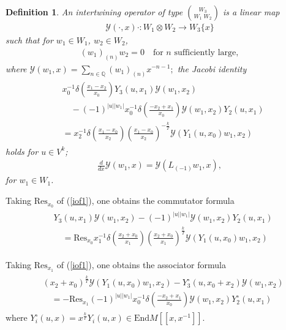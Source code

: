\documentclass[9pt]{amsart}
\newtheorem{definition}{Definition}[section]
\begin{document}
\begin{definition}
An intertwining operator of type $\binom{W_{3}}{W_{1}\;W_{2}}$ is a linear map
\begin{align*}
    \mathcal{Y}(\cdot,x)\cdot :W_{1}\otimes W_2 \rightarrow W_3\{x\}
\end{align*}
such that for $w_{1}\in W_{1}$, $w_{2}\in W_{2}$,
\begin{align}
    (w_{1})_{(n)}w_{2}=0\quad \text{for $n$ sufficiently large},
\end{align}
where $\mathcal{Y}(w_1,x)=\sum_{n\in \mathbb{Q}}(w_1)_{(n)}x^{-n-1};$
the Jacobi identity
\begin{align}\label{iof1}
\begin{split}
  &  x_0^{-1}\delta\left(\frac{x_1-x_2}{x_0}\right)Y_{3}(u,x_{1})\mathcal{Y}(w_1,x_2) \\
  &  \quad -(-1)^{|u||w_1|}x_0^{-1}\delta\left(\frac{-x_2+x_1}{x_0}\right)\mathcal{Y}(w_1,x_2)Y_{2}(u,x_1) \\
  &= x_2^{-1}\delta\left(\frac{x_1-x_0}{x_2}\right)\left(\frac{x_1-x_0}{x_2}\right)^{-\frac{k}{T}}\mathcal{Y}(Y_{1}(u,x_0)w_1,x_2)
\end{split}
\end{align}
holds for $u\in V^{k}$;
\begin{align}
    \frac{d}{dx}\mathcal{Y}(w_{1},x)=\mathcal{Y}(L_{(-1)}w_1,x),
\end{align}
for $w_1\in W_1$.
\end{definition}

Taking $\text{Res}_{x_{0}}$ of (\ref{iof1}), one obtains the commutator formula
\begin{align}\label{commutator1}
    \begin{split}
        &Y_{3}(u,x_{1})\mathcal{Y}(w_1,x_2) - (-1)^{|u||w_1|}\mathcal{Y}(w_1,x_2)Y_{2}(u,x_1) \\
        &\quad = \text{Res}_{x_{0}} x_1^{-1}\delta\left(\frac{x_2+x_0}{x_1}\right)\left(\frac{x_2+x_0}{x_1}\right)^{\frac{k}{T}} \mathcal{Y}(Y_{1}(u,x_0)w_1,x_2)
    \end{split}
\end{align}

Taking $\text{Res}_{x_{1}}$ of (\ref{iof1}), one obtains the associator formula
\begin{align}\label{associator}
    \begin{split}
        &(x_2+x_0)^{\frac{k}{T}}\mathcal{Y}(Y_1(u,x_0)w_1,x_2) - Y_3^\circ(u,x_0+x_2)\mathcal{Y}(w_1,x_2) \\
        &\quad = -\text{Res}_{x_{1}}(-1)^{|u||w_1|}x_0^{-1}\delta\left(\frac{-x_2+x_1}{x_0}\right)\mathcal{Y}(w_1,x_2)Y_2^\circ(u,x_1)
    \end{split}
\end{align}
where $Y^\circ_i(u,x)=x^{\frac{k}{T}}Y_i(u,x)\in \text{End}M[[ x,x^{-1} ]].$
\end{document}
